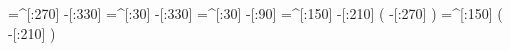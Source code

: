     =^[:270]%
     -[:330]%
     =^[:30]%
     -[:330]%
     =^[:30]%
      -[:90]%
    =^[:150]%
     -[:210]%
               (
         -[:270]\phantom{4}%
               )
    =^[:150]%
               (
         -[:210]\phantom{1}%
               )